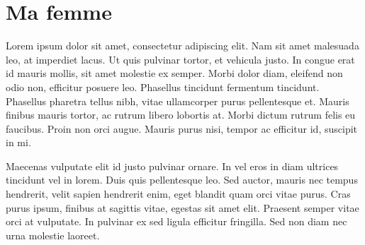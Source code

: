 \documentclass[a4paper]{report}
\begin{document}
\section{Ma femme}
Lorem ipsum dolor sit amet, consectetur adipiscing elit. Nam sit amet malesuada leo, at imperdiet lacus. Ut quis pulvinar tortor, et vehicula justo. In congue erat id mauris mollis, sit amet molestie ex semper. Morbi dolor diam, eleifend non odio non, efficitur posuere leo. Phasellus tincidunt fermentum tincidunt. Phasellus pharetra tellus nibh, vitae ullamcorper purus pellentesque et. Mauris finibus mauris tortor, ac rutrum libero lobortis at. Morbi dictum rutrum felis eu faucibus. Proin non orci augue. Mauris purus nisi, tempor ac efficitur id, suscipit in mi.

Maecenas vulputate elit id justo pulvinar ornare. In vel eros in diam ultrices tincidunt vel in lorem. Duis quis pellentesque leo. Sed auctor, mauris nec tempus hendrerit, velit sapien hendrerit enim, eget blandit quam orci vitae purus. Cras purus ipsum, finibus at sagittis vitae, egestas sit amet elit. Praesent semper vitae orci at vulputate. In pulvinar ex sed ligula efficitur fringilla. Sed non diam nec urna molestie laoreet.
\end{document}
